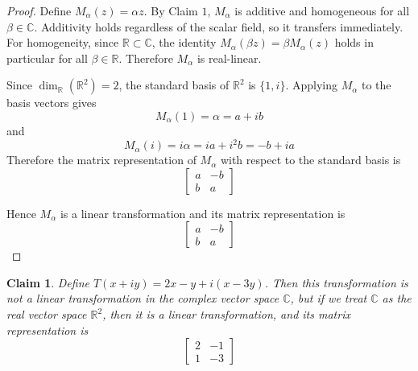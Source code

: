 \documentclass{article}
\newtheorem{claim}{Claim}
\begin{document}
\begin{proof}
    Define $M_\alpha(z) = \alpha z$. By Claim $1$, $M_\alpha$ is additive and homogeneous for all 
    $\beta \in \mathbb{C}$. Additivity holds regardless of the scalar field, so it transfers immediately. 
    For homogeneity, since $\mathbb{R} \subset \mathbb{C}$, the identity 
    $M_\alpha(\beta z) = \beta M_\alpha(z)$ holds in particular for all $\beta \in \mathbb{R}$. Therefore 
    $M_\alpha$ is real-linear.

    \medskip

    Since $\dim_\mathbb{R}(\mathbb{R}^2) = 2$, the standard basis of $\mathbb{R}^2$ is $\{1, i\}$. Applying 
    $M_\alpha$ to the basis vectors gives
    \[
    M_\alpha(1) = \alpha = a + ib
    \]
    and
    \[
    M_\alpha(i) = i\alpha = ia + i^2b = -b + ia
    \]
    Therefore the matrix representation of $M_\alpha$ with respect to the standard basis is 
    \[
    \begin{bmatrix}
        a & -b \\
        b & a
    \end{bmatrix}
    \]

    \medskip

    Hence $M_\alpha$ is a linear transformation and its matrix representation is 
    \[
    \begin{bmatrix}
        a & -b \\
        b & a
    \end{bmatrix}
    \]
\end{proof}

\begin{claim}
    Define $T(x + iy) = 2x - y + i(x - 3y)$. Then this transformation is not a linear transformation in 
    the complex vector space $\mathbb{C}$, but if we treat $\mathbb{C}$ as the real vector space 
    $\mathbb{R}^2$, then it is a linear transformation, and its matrix representation is 
    \[
    \begin{bmatrix}
        2 & -1 \\
        1 & -3
    \end{bmatrix}
    \]
\end{claim}
\end{document}
